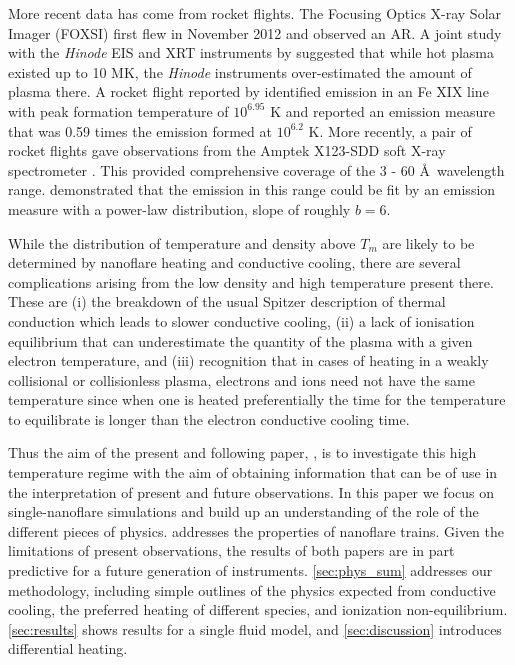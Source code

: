 \documentclass[apj]{emulateapj}
\newcommand{\ang}{\AA~}
\begin{document}
%
	\par More recent data has come from rocket flights. The Focusing Optics X-ray Solar Imager (FOXSI) \citep{krucker_focusing_2011} first flew in November 2012 and observed an AR. A joint study with the \textit{Hinode} EIS and XRT instruments by \citet{ishikawa_constraining_2014} suggested that while hot plasma existed up to 10 MK, the \textit{Hinode} instruments over-estimated the amount of plasma there. A rocket flight reported by \citet{brosius_pervasive_2014} identified emission in an Fe XIX line with peak formation temperature of $10^{6.95}$ K and reported an emission measure that was 0.59 times the emission formed at $10^{6.2}$ K. More recently, a pair of rocket flights gave observations from the Amptek X123-SDD soft X-ray spectrometer \citep{caspi_new_2015}. This provided comprehensive coverage of the 3 - 60 \ang wavelength range. \citeauthor{caspi_new_2015} demonstrated that the emission in this range could be fit by an emission measure with a power-law distribution, slope of roughly $b = 6$. 
%
	\par While the distribution of temperature and density above $T_m$ are likely to be determined by nanoflare heating and conductive cooling, there are several complications arising from the low density and high temperature present there. These are (i) the breakdown of the usual Spitzer description of thermal conduction which leads to slower conductive cooling, (ii) a lack of ionisation equilibrium that can underestimate the quantity of the plasma with a given electron temperature, and (iii) recognition that in cases of heating in a weakly collisional or collisionless plasma, electrons and ions need not have the same temperature since when one is heated preferentially the time for the temperature to equilibrate is longer than the electron conductive cooling time.
%
	\par Thus the aim of the present and following paper, \citet[in preparation]{barnes_inference_2016-1} , is to investigate this high temperature regime with the aim of obtaining information that can be of use in the interpretation of present and future observations. In this paper we focus on single-nanoflare simulations and build up an understanding of the role of the different pieces of physics.  addresses the properties of nanoflare trains. Given the limitations of present observations, the results of both papers are in part predictive for a future generation of instruments. \autoref{sec:phys_sum} addresses our methodology, including simple outlines of the physics expected from conductive cooling, the preferred heating of different species, and ionization non-equilibrium. \autoref{sec:results} shows results for a single fluid model, and \autoref{sec:discussion} introduces differential heating.
	
\end{document}
